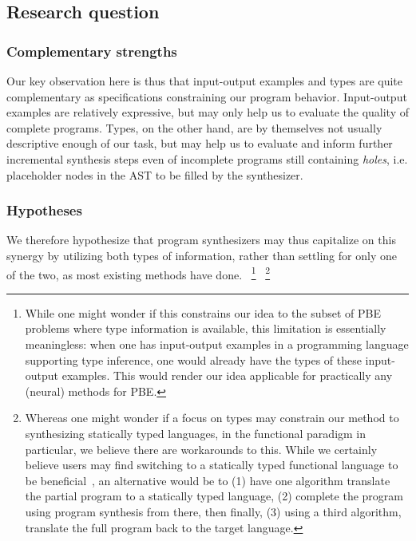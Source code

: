 \documentclass{article}
\begin{document}
\subsection{Research question}

\subsubsection{Complementary strengths}

Our key observation here is thus that input-output examples and types are quite complementary as specifications constraining our program behavior.
Input-output examples are relatively expressive, but may only help us to evaluate the quality of complete programs.
Types, on the other hand, are by themselves not usually descriptive enough of our task,
but may help us to evaluate and inform further incremental synthesis steps even of incomplete programs still containing \emph{holes},
i.e. placeholder nodes in the AST to be filled by the synthesizer.

\subsubsection{Hypotheses}

We therefore hypothesize that program synthesizers may thus capitalize on this synergy by utilizing both types of information,
rather than settling for only one of the two, as most existing methods have done.%
~\footnote{
    While one might wonder if this constrains our idea to the subset of PBE problems where type information is available,
    this limitation is essentially meaningless:
    when one has input-output examples in a programming language supporting type inference,
    one would already have the types of these input-output examples.
    This would render our idea applicable for practically any (neural) methods for PBE.
}%
~\footnote{
    Whereas one might wonder if a focus on types may constrain our method to synthesizing statically typed languages,
    in the functional paradigm in particular, we believe there are workarounds to this.
    While we certainly believe users may find switching to a statically typed functional language to be beneficial~\citep{hughes1989functional},
    an alternative would be to (1) have one algorithm translate the partial program to a statically typed language,
    (2) complete the program using program synthesis from there,
    then finally, (3) using a third algorithm, translate the full program back to the target language.
}
\end{document}

